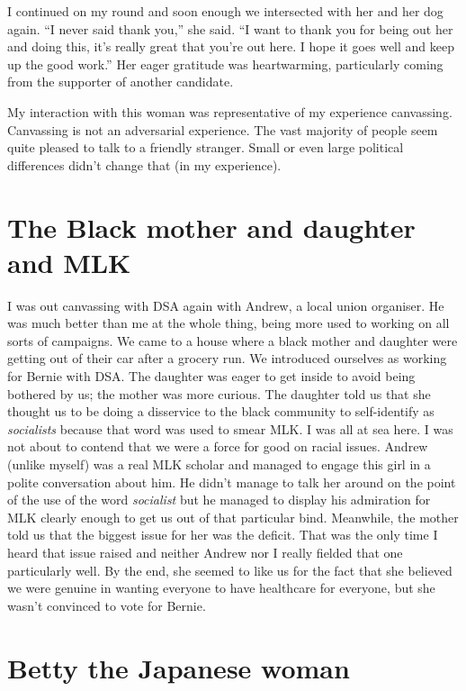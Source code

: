 \documentclass[]{book}
\begin{document}
I continued on my round and soon enough we intersected with her and her dog again. ``I never said thank you,'' she said. ``I want to thank you for being out her and doing this, it's really great that you're out here. I hope it goes well and keep up the good work.'' Her eager gratitude was heartwarming, particularly coming from the supporter of another candidate.

My interaction with this woman was representative of my experience canvassing. Canvassing is not an adversarial experience. The vast majority of people seem quite pleased to talk to a friendly stranger. Small or even large political differences didn't change that (in my experience).

\hypertarget{the-black-mother-and-daughter-and-mlk}{%
\section{The Black mother and daughter and MLK}\label{the-black-mother-and-daughter-and-mlk}}

I was out canvassing with DSA again with Andrew, a local union organiser. He was much better than me at the whole thing, being more used to working on all sorts of campaigns. We came to a house where a black mother and daughter were getting out of their car after a grocery run. We introduced ourselves as working for Bernie with DSA. The daughter was eager to get inside to avoid being bothered by us; the mother was more curious. The daughter told us that she thought us to be doing a disservice to the black community to self-identify as \emph{socialists} because that word was used to smear MLK. I was all at sea here. I was not about to contend that we were a force for good on racial issues. Andrew (unlike myself) was a real MLK scholar and managed to engage this girl in a polite conversation about him. He didn't manage to talk her around on the point of the use of the word \emph{socialist} but he managed to display his admiration for MLK clearly enough to get us out of that particular bind. Meanwhile, the mother told us that the biggest issue for her was the deficit. That was the only time I heard that issue raised and neither Andrew nor I really fielded that one particularly well. By the end, she seemed to like us for the fact that she believed we were genuine in wanting everyone to have healthcare for everyone, but she wasn't convinced to vote for Bernie.

\hypertarget{betty-the-japanese-woman}{%
\section{Betty the Japanese woman}\label{betty-the-japanese-woman}}
\end{document}
